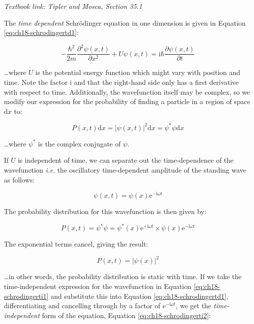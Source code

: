 \documentclass[
]{book}
\begin{document}
\emph{Textbook link: Tipler and Mosca, Section 35.1}

The \emph{time dependent} Schrödinger equation in one dimension is given in Equation \eqref{eq:ch18-schrodingertd1}:

\begin{equation}
-\frac{\hbar^2}{2m} \frac{\partial^2 \psi(x,t)}{\partial x^2} + U \psi(x,t) = \mathrm{i}\hbar \frac{\partial \psi(x,t)}{\partial t}
\label{eq:ch18-schrodingertd1}
\end{equation}

\ldots where \(U\) is the potential energy function which might vary with position and time. Note the factor \(\mathrm{i}\) and that the right-hand side only has a first derivative with respect to time. Additionally, the wavefunction itself may be complex, so we modify our expression for the probability of finding a particle in a region of space \(\mathrm{d}x\) to:

\begin{equation}
P(x,t) \mathrm{d}x = |\psi(x,t)|^2 \mathrm{d}x= \psi^*\psi \mathrm{d}x
\end{equation}

\ldots where \(\psi^*\) is the complex conjugate of \(\psi\).

If \(U\) is independent of time, we can separate out the time-dependence of the wavefunction \emph{i.e.} the oscillatory time-dependent amplitude of the standing wave as follows:

\begin{equation}
\psi(x,t) = \psi(x) \mathrm{e}^{-\mathrm{i}\omega t}
\label{eq:ch18-schrodingerti1}
\end{equation}

The probability distribution for this wavefunction is then given by:

\begin{equation}
P(x,t) = \psi^* \psi = \psi^*(x) \mathrm{e}^{+\mathrm{i}\omega t} \times \psi(x) \mathrm{e}^{-\mathrm{i}\omega t}
\end{equation}

The exponential terms cancel, giving the result:

\begin{equation}
P(x,t) = |\psi(x)|^2
\end{equation}

\ldots in other words, the probability distribution is static with time. If we take the time-independent expression for the wavefunction in Equation \eqref{eq:ch18-schrodingerti1} and substitute this into Equation \eqref{eq:ch18-schrodingertd1}, differentiating and cancelling through by a factor of \(\mathrm{e}^{-\mathrm{i}\omega t}\), we get the \emph{time-independent} form of the equation, Equation \eqref{eq:ch18-schrodingerti2}:
\end{document}

